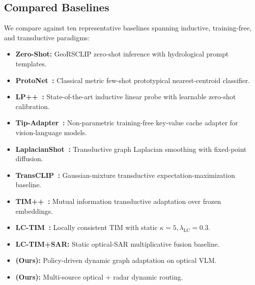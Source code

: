 \subsection{Compared Baselines}
We compare \rllctim{} against ten representative baselines spanning inductive, training-free, and transductive paradigms:
\begin{itemize}
    \item \textbf{Zero-Shot:} GeoRSCLIP zero-shot inference with hydrological prompt templates.
    \item \textbf{ProtoNet~\cite{snell2017prototypical}:} Classical metric few-shot prototypical nearest-centroid classifier.
    \item \textbf{LP++~\cite{huang2024lpplusplus}:} State-of-the-art inductive linear probe with learnable zero-shot calibration.
    \item \textbf{Tip-Adapter~\cite{zhang2022tipadapter}:} Non-parametric training-free key-value cache adapter for vision-language models.
    \item \textbf{LaplacianShot~\cite{ziko2020laplacianshot}:} Transductive graph Laplacian smoothing with fixed-point diffusion.
    \item \textbf{TransCLIP~\cite{zanella2024boosting}:} Gaussian-mixture transductive expectation-maximization baseline.
    \item \textbf{TIM++~\cite{li2026timplusplus}:} Mutual information transductive adaptation over frozen embeddings.
    \item \textbf{LC-TIM~\cite{elkhoury2026lctim}:} Locally consistent TIM with static $\kappa=5, \lambda_{\text{LC}}=0.3$.
    \item \textbf{LC-TIM+SAR:} Static optical-SAR multiplicative fusion baseline.
    \item \textbf{\rllctim{} (Ours):} Policy-driven dynamic graph adaptation on optical VLM.
    \item \textbf{\rllctimd{} (Ours):} Multi-source optical + radar dynamic routing.
\end{itemize}

